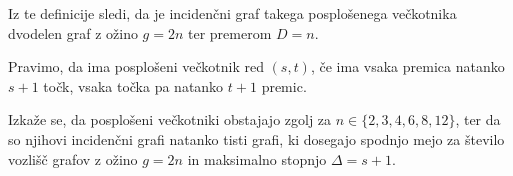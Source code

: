 \documentclass{fmfkpb}
\begin{document}
Iz te definicije sledi, da je incidenčni graf takega posplošenega večkotnika 
dvodelen graf z ožino $g=2n$ ter premerom $D=n$.


Pravimo, da ima posplošeni večkotnik red $(s, t)$, če ima vsaka premica
natanko $s + 1$ točk, vsaka točka pa natanko $t + 1$ premic. 

Izkaže se, da posplošeni večkotniki obstajajo zgolj za 
$n \in \{2, 3, 4, 6, 8, 12\}$, ter da so njihovi incidenčni grafi 
natanko tisti grafi, ki dosegajo spodnjo mejo za število vozlišč
grafov z ožino $g=2n$ in maksimalno stopnjo $\Delta = s + 1$.
\end{document}
